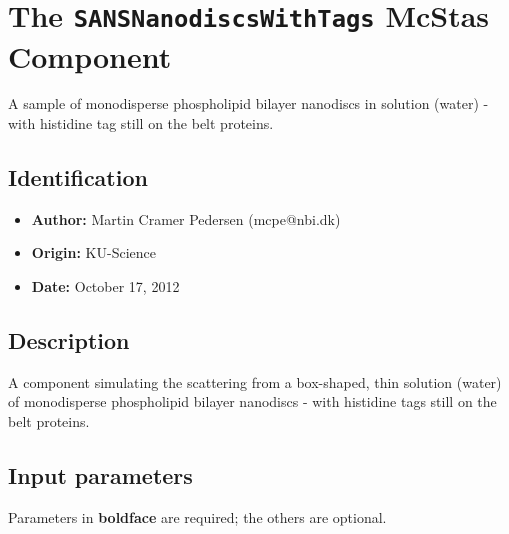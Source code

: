 \section{The \texttt{SANSNanodiscsWithTags} McStas Component}
A sample of monodisperse phospholipid bilayer nanodiscs in solution (water) - with
histidine tag still on the belt proteins.

\subsection*{Identification}
\begin{itemize}
  \item \textbf{Author:} Martin Cramer Pedersen (mcpe@nbi.dk)
  \item \textbf{Origin:} KU-Science
  \item \textbf{Date:} October 17, 2012
\end{itemize}

\subsection*{Description}
A component simulating the scattering from a box-shaped, thin solution (water) of monodisperse phospholipid bilayer nanodiscs - with histidine tags still on the belt proteins.

\subsection*{Input parameters}
Parameters in \textbf{boldface} are required; the others are optional.

